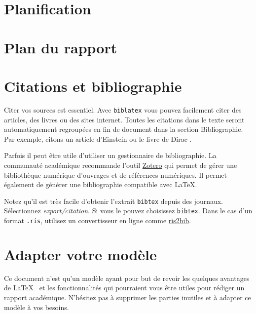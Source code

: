 \section{Planification}

\section{Plan du rapport}

\section{Citations et bibliographie}
Citer vos sources est essentiel. Avec \texttt{biblatex} vous pouvez facilement citer des articles, des livres ou des sites internet. Toutes les citations dans le texte seront automatiquement regroupées en fin de document dans la section \guillemotleft Bibliographie\guillemotright. Par exemple, citons un article d'Einstein \cite{einstein} ou le livre de Dirac \cite{dirac}.

Parfois il peut être utile d'utiliser un gestionnaire de bibliographie. La communauté académique recommande l'outil \href{https://www.zotero.org/}{Zotero} qui permet de gérer une bibliothèque numérique d'ouvrages et de références numériques. Il permet également de générer une bibliographie compatible avec \LaTeX.

Notez qu'il est très facile d'obtenir l'extrait \texttt{bibtex} depuis des journaux. Sélectionnez \emph{export/citation}. Si vous le pouvez choisissez \texttt{bibtex}. Dans le cas d'un format \texttt{.ris}, utilisez un convertisseur en ligne comme \href{http://www.bruot.org/ris2bib/}{ris2bib}.

\section{Adapter votre modèle}
Ce document n'est qu'un modèle ayant pour but de revoir les quelques avantages de \LaTeX~ et les fonctionnalités qui pourraient vous être utiles pour rédiger un rapport académique. N'hésitez pas à supprimer les parties inutiles et à adapter ce modèle à vos besoins.
